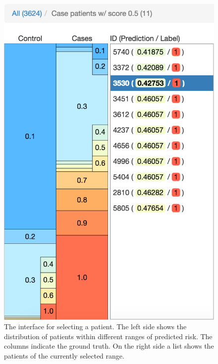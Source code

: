 \begin{figure}[t]
\centering
\includegraphics[width=0.5\linewidth]{prospector/patient_select} %
\caption{
The interface for selecting a patient.
The left side shows the distribution of patients within different ranges of predicted risk.
The columns indicate the ground truth.
On the right side a list shows the patients of the currently selected range.
}
\label{figs:select}
\end{figure}